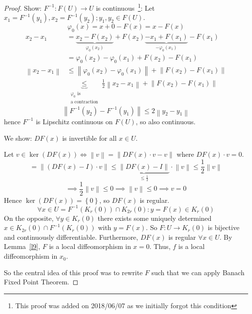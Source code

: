 \documentclass{article}
\newcommand{\set}[1]{\left\{#1\right\}}
\newcommand{\norm}[1]{\left\|#1\right\|}
\begin{document}
\begin{proof}
  Show: $F^{-1}: F(U) \to U$ is continuous~\footnote{This proof was added on 2018/06/07 as we initially forgot this condition}:
  Let $x_1 = F^{-1}(y_1), x_2 = F^{-1}(y_2); y_1, y_2 \in F(U)$.
  \[ \varphi_0(x) = x + 0 - F(x) = x - F(x) \]
  \begin{align*}
    x_2 - x_1 &= \underbrace{x_2 - F(x_2)}_{\varphi_0(x_2)} + F(x_2) \underbrace{- x_1 + F(x_1)}_{- \varphi_0(x_1)} - F(x_1) \\
      &= \varphi_0(x_2) - \varphi_0(x_1) + F(x_2) - F(x_1) \\
    \norm{x_2 - x_1} &\leq \norm{\varphi_0(x_2) - \varphi_0(x_1)} + \norm{F(x_2) - F(x_1)} \\
      &\underbrace{\leq}_{\substack{\varphi_0 \text{ is} \\ \text{a contraction}}} \frac12 \norm{x_2 - x_1} + \norm{F(x_2) - F(x_1)}
  \end{align*}
  \[ \norm{F^{-1}(y_2) - F^{-1}(y_1)} \leq 2 \norm{y_2 - y_1} \]
  hence $F^{-1}$ is Lipschitz continuous on $F(U)$, so also continuous.
  
  We show: $DF(x)$ is invertible for all $x \in U$.
  
  Let $v \in \ker(DF(x)) \iff \norm v = \norm{DF(x) \cdot v - v}$ where $DF(x) \cdot v = 0$.
  \[ = \norm{(DF(x) - I) \cdot v} \leq \underbrace{\norm{DF(x) - I}}_{\leq \frac12} \cdot \norm v \leq \frac12 \norm v \]
  \[ \implies \frac12 \norm v \leq 0 \implies \norm v \leq 0 \implies v = 0 \]
  Hence $\ker(DF(x)) = \set{0}$, so $DF(x)$ is regular.
  \[ \forall x \in U = F^{-1}(K_r(0)) \cap K_{2r}(0): y = F(x) \in K_r(0) \]
  On the opposite, $\forall y \in K_r(0)$ there exists some uniquely determined $x \in K_{2r}(0) \cap F^{-1}(K_r(0))$ with $y = F(x)$.
  So $F: U \to K_r(0)$ is bijective and continuously differentiable. Furthermore, $DF(x)$ is regular $\forall x \in U$.
  By Lemma~\ref{l9}, $F$ is a local diffeomorphism in $x = 0$.
  Thus, $f$ is a local diffeomorphism in $x_0$.
  
  So the central idea of this proof was to rewrite $F$ such that we can apply Banach Fixed Point Theorem.
\end{proof}
\end{document}
